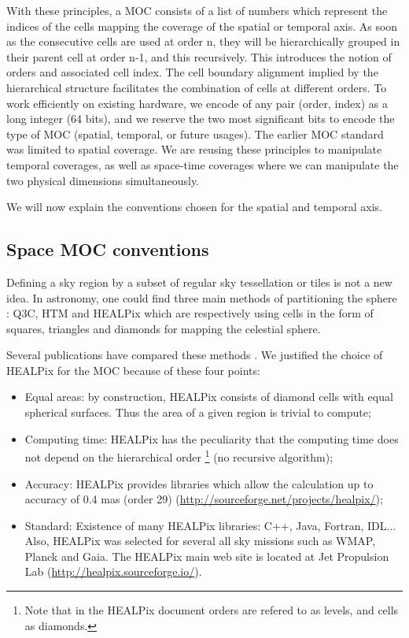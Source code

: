 \documentclass[11pt,a4paper]{ivoa}
\begin{document}
With these principles, a MOC consists of a list of numbers which
represent the indices of the cells mapping the coverage of the spatial
or temporal axis.
As soon as the consecutive cells are used at order n, they will be
hierarchically grouped in their parent cell at order n-1, and
this recursively. This introduces the notion of orders and
associated cell index.
The cell boundary alignment implied by the hierarchical structure
facilitates the combination of cells at different orders. 
To work efficiently on existing hardware, we encode of any pair
(order, index) as a long integer (64 bits), and we reserve the two
most significant bits to encode the type of MOC (spatial, temporal,
or future usages). 
The earlier MOC standard was limited to spatial coverage.
We are reusing these principles to manipulate temporal coverages,
as well as space-time coverages where we can manipulate the two
physical dimensions simultaneously.

\medskip
\par\noindent
We will now explain the conventions chosen for the spatial and temporal axis.

\subsection{Space MOC conventions}
Defining a sky region by a subset of regular sky tessellation or tiles
is not a new idea.  In astronomy, one could find three main methods of
partitioning the sphere : Q3C, HTM and HEALPix which are respectively
using cells in the form of squares, triangles and diamonds for mapping
the celestial sphere.

Several publications have compared these methods \citep{2001misk.conf..638O}. We
justified the choice of HEALPix for the MOC because of these four
points:

\begin{itemize}
\item Equal areas: by construction, HEALPix consists of diamond cells with
  equal spherical surfaces. Thus the area of a given region is trivial
  to compute;
\item Computing time: HEALPix has the peculiarity that the computing
  time does not depend on the hierarchical order \footnote{Note that in the HEALPix
  document orders are refered to as levels, and cells as diamonds.}
  (no recursive  algorithm);
\item Accuracy: HEALPix provides libraries which allow the calculation
  up to accuracy of 0.4 mas (order 29) (\url{http://sourceforge.net/projects/healpix/});
\item Standard: Existence of many HEALPix libraries: C++, Java,
  Fortran, IDL... Also, HEALPix was selected for several all sky
  missions such as WMAP, Planck and Gaia. The HEALPix main web site is
  located at Jet Propulsion Lab (\url{http://healpix.sourceforge.io/}).
\end{itemize}
\end{document}
